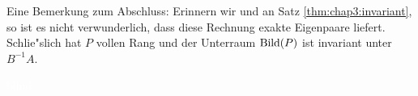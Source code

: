 Eine Bemerkung zum Abschluss: Erinnern wir und an Satz \ref{thm:chap3:invariant}, so ist es nicht verwunderlich, dass diese Rechnung
exakte Eigenpaare liefert. Schlie"slich hat $P$
vollen Rang und der Unterraum $\operatorname{Bild}(P)$ ist invariant unter $B^{-1}A$.

\newpage
\textcolor{white}{blind}



